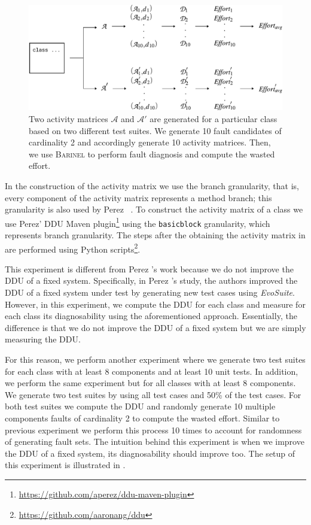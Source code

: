 \documentclass[twoside,a4paper,11pt]{memoir}
\begin{document}
\begin{figure}
  \includegraphics[width=\linewidth]{figures/delta_effort_approach}
  \caption{Two activity matrices \(\mathcal{A} \) and \(\mathcal{A}' \) are generated for a particular class based on two different test suites. We generate 10 fault candidates of cardinality 2 and accordingly generate 10 activity matrices. Then, we use \textsc{Barinel} to perform fault diagnosis and compute the wasted effort.}%
  \label{fig:fault_generation_delta}
\end{figure}

In the construction of the activity matrix we use the branch granularity, that is, every component of the activity matrix represents a method branch; this granularity is also used by Perez \etal~\cite{DBLP:conf/icse/PerezAD17}.
To construct the activity matrix of a class we use Perez' DDU Maven plugin\footnote{\url{https://github.com/aperez/ddu-maven-plugin}} using the \texttt{basicblock} granularity, which represents branch granularity.
The steps after the obtaining the activity matrix in  are performed using Python scripts\footnote{\url{https://github.com/aaronang/ddu}}.

This experiment is different from Perez \etal's work because we do not improve the DDU of a fixed system.
Specifically, in Perez \etal's study, the authors improved the DDU of a fixed system under test by generating new test cases using \emph{EvoSuite}.
However, in this experiment, we compute the DDU for each class and measure for each class its diagnosability using the aforementioned approach.
Essentially, the difference is that we do not improve the DDU of a fixed system but we are simply measuring the DDU\@.



For this reason, we perform another experiment where we generate two test suites for each class with at least 8 components and at least 10 unit tests.
In addition, we perform the same experiment but for all classes with at least 8 components.
We generate two test suites by using all test cases and 50\% of the test cases.
For both test suites we compute the DDU and randomly generate 10 multiple components faults of cardinality 2 to compute the wasted effort.
Similar to previous experiment we perform this process 10 times to account for randomness of generating fault sets.
The intuition behind this experiment is when we improve the DDU of a fixed system, its diagnosability should improve too.
The setup of this experiment is illustrated in .
\end{document}
